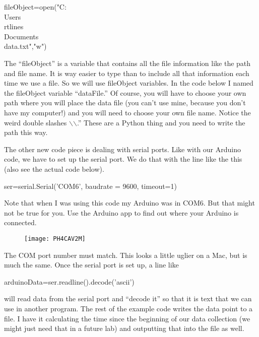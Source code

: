 \begin{python}
	fileObject=open("C:\\Users\\rtlines\\Documents\\data.txt","w")	
\end{python}
\vspace{.1in}

The ``fileObject'' is a variable that contains all the file information like the path and file name. It is way easier to type than to include all that information each time we use a file. So we will use fileObject variables. In the code below I named the fileObject variable ``dataFile.'' Of course, you will have to choose your own path where you will place the data file (you can't use mine, because you don't have my computer!) and you will need to choose your own file name. Notice the weird double slashes $\backslash$$\backslash$.'' These are a Python thing and you need to write the path this way.

The other new code piece is dealing with serial ports. Like with our Arduino code, we have to set up the serial port. We do that with the line like the this (also see the actual code below).

\vspace{.1in}
\begin{python}
	ser=serial.Serial('COM6', baudrate = 9600, timeout=1)
\end{python}
\vspace{.1in}

Note that when I was using this code my Arduino was in COM6. But that might not be true for you. Use the Arduino app to find out where your Arduino is connected. 

\begin{figure}[h!]
	\texttt{[image: PH4CAV2M]}
\end{figure}

The COM port number must match. This looks a little uglier on a Mac, but is much the same. Once the serial port is set up, a line like 

\vspace{.1in}
\begin{python}
	arduinoData=ser.readline().decode('ascii')
\end{python}
\vspace{.1in}

\noindent will read data from the serial port and ``decode it'' so that it is text that we can use in another program. The rest of the example code writes the data point to a file. I have it calculating the time since the beginning of our data collection (we might just need that in a future lab) and outputting that into the file as well.

